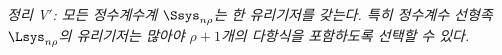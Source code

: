 
\emph{정리 V$'$: 모든 정수계수계 $\Ssys_{n\rho}$는 한 유리기저를 갖는다. 특히 정수계수 선형족 $\Lsys_{n\rho}$의 유리기저는 많아야 $\rho+1$개의 다항식을 포함하도록 선택할 수 있다.}
